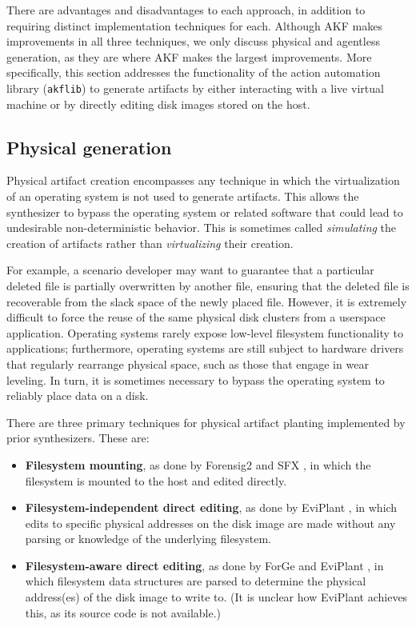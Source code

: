 There are advantages and disadvantages to each approach, in addition to
requiring distinct implementation techniques for each. Although AKF
makes improvements in all three techniques, we only discuss physical and
agentless generation, as they are where AKF makes the largest
improvements. More specifically, this section addresses the
functionality of the action automation library
(\passthrough{\lstinline!akflib!}) to generate artifacts by either
interacting with a live virtual machine or by directly editing disk
images stored on the host.

\subsection{Physical generation}\label{physical-generation}

Physical artifact creation encompasses any technique in which the
virtualization of an operating system is not used to generate artifacts.
This allows the synthesizer to bypass the operating system or related
software that could lead to undesirable non-deterministic behavior. This
is sometimes called \emph{simulating} the creation of artifacts rather
than \emph{virtualizing} their creation.

For example, a scenario developer may want to guarantee that a
particular deleted file is partially overwritten by another file,
ensuring that the deleted file is recoverable from the slack space of
the newly placed file. However, it is extremely difficult to force the
reuse of the same physical disk clusters from a userspace application.
Operating systems rarely expose low-level filesystem functionality to
applications; furthermore, operating systems are still subject to
hardware drivers that regularly rearrange physical space, such as those
that engage in wear leveling. In turn, it is sometimes necessary to
bypass the operating system to reliably place data on a disk.

There are three primary techniques for physical artifact planting
implemented by prior synthesizers. These are:

\begin{itemize}
\item
  \textbf{Filesystem mounting}, as done by Forensig2
  \cite{mochForensicImageGenerator2009} and SFX
  \cite{russellForensicImageDescription2012}, in which the
  filesystem is mounted to the host and edited directly.
\item
  \textbf{Filesystem-independent direct editing}, as done by EviPlant
  \cite{scanlonEviPlantEfficientDigital2017}, in which edits to
  specific physical addresses on the disk image are made without any
  parsing or knowledge of the underlying filesystem.
\item
  \textbf{Filesystem-aware direct editing}, as done by ForGe
  \cite{vistiAutomaticCreationComputer2015} and EviPlant
  \cite{scanlonEviPlantEfficientDigital2017}, in which filesystem
  data structures are parsed to determine the physical address(es) of
  the disk image to write to. (It is unclear how EviPlant achieves this,
  as its source code is not available.)
\end{itemize}

